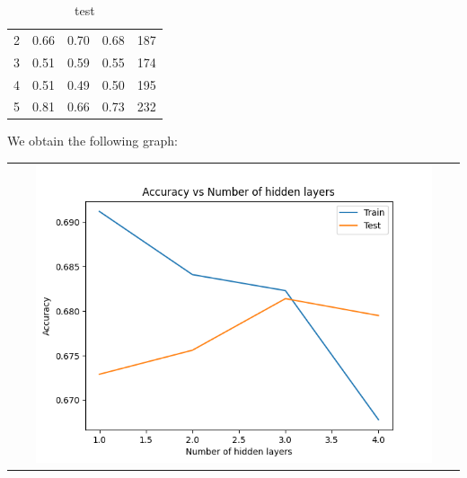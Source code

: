 \begin{enumerate}[label=(\alph*)]
\begin{enumerate}[label=\roman*.]
\begin{table}[!htb]
\begin{tabular}{ccccc}
            2     & 0.66      & 0.70   & 0.68    & 187     \\
            3     & 0.51      & 0.59   & 0.55    & 174     \\
            4     & 0.51      & 0.49   & 0.50    & 195     \\
            5     & 0.81      & 0.66   & 0.73    & 232     \\ \hline
            \end{tabular}
            \caption{test}
            \label{part c test depth 4}
        \end{table}
        \newpage
        

    \end{enumerate}
    We obtain the following graph:
    \begin{center}
        \begin{tabular}{c}
            \includegraphics[width=0.9\textwidth]{../Q2/Graphs/part_c.png}
        \end{tabular}
    \end{center}


\end{enumerate}
